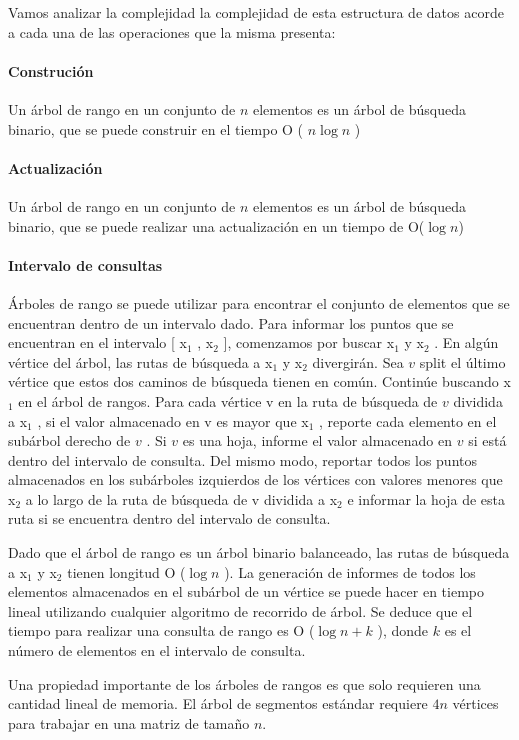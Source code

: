 Vamos analizar la complejidad la complejidad de esta estructura de datos acorde a cada una de las operaciones que la misma presenta:

\paragraph{Construción}
Un árbol de rango en un conjunto de $n$ elementos es un árbol de búsqueda binario, que se puede construir en el tiempo O ( $n\log n$ )

\paragraph{Actualización} Un árbol de rango en un conjunto de $n$ elementos es un árbol de búsqueda binario, que se puede realizar una actualización  en un tiempo de  O($\log n$)

\paragraph{Intervalo de consultas}
Árboles de rango se puede utilizar para encontrar el conjunto de elementos que se encuentran dentro de un intervalo dado. Para informar los puntos que se encuentran en el intervalo [ x$_{1}$ , x$_{2}$ ], comenzamos por buscar x$_{1}$ y x$_{2}$ . En algún vértice del árbol, las rutas de búsqueda a x$_{1}$ y x$_{2}$ divergirán. Sea $v$ split el último vértice que estos dos caminos de búsqueda tienen en común. Continúe buscando x$_{1}$ en el árbol de rangos. Para cada vértice v en la ruta de búsqueda de $v$ dividida a x$_{1}$ , si el valor almacenado en v es mayor que x$_{1}$ , reporte cada elemento en el subárbol derecho de $v$ . Si $v$ es una hoja, informe el valor almacenado en $v$ si está dentro del intervalo de consulta. Del mismo modo, reportar todos los puntos almacenados en los subárboles izquierdos de los vértices con valores menores que x$_{2}$ a lo largo de la ruta de búsqueda de v dividida a x$_{2}$ e informar la hoja de esta ruta si se encuentra dentro del intervalo de consulta.

Dado que el árbol de rango es un árbol binario balanceado, las rutas de búsqueda a x$_{1}$ y x$_{2}$ tienen longitud O ($\log n$ ). La generación de informes de todos los elementos almacenados en el subárbol de un vértice se puede hacer en tiempo lineal utilizando cualquier algoritmo de recorrido de árbol. Se deduce que el tiempo para realizar una consulta de rango es O ($\log n+k$ ), donde $k$ es el número de elementos en el intervalo de consulta.

Una propiedad importante de los árboles de rangos es que solo requieren una cantidad lineal de memoria. El árbol de segmentos estándar requiere $4n$ vértices para trabajar en una matriz de tamaño $n$.
